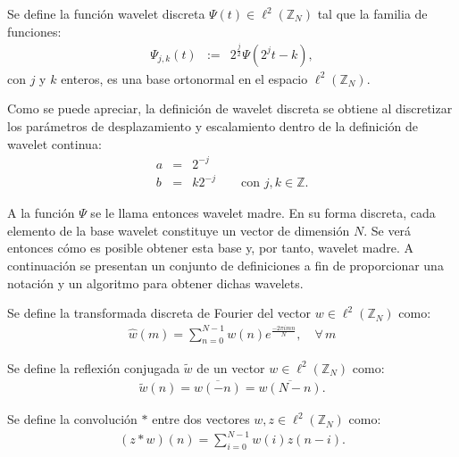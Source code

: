 \begin{definition}
Se define la funci\'on wavelet discreta $\Psi(t)\in \ell^2(\mathbb{Z}_N)$ tal que la familia de funciones:
\begin{eqnarray}
\Psi_{j,k}(t)&:=&2^{\frac{j}{2}}\Psi(2^jt-k),\nonumber
\end{eqnarray}
con $j$ y $k$ enteros, es una base ortonormal en el espacio $\ell^2(\mathbb{Z}_N)$.
\label{wav-discreta}
\end{definition}

\par Como se puede apreciar, la definici\'on de wavelet discreta se obtiene al discretizar los parámetros de desplazamiento y escalamiento dentro de la definici\'on de wavelet continua:
\begin{eqnarray}
a&=&2^{-j}\nonumber\\
b&=&k2^{-j}\qquad\mbox{con $j,k\in \mathbb{Z}$}.\nonumber
\end{eqnarray}

\par A la funci\'on $\Psi$ se le llama entonces wavelet madre. En su forma discreta, cada elemento de la base wavelet constituye un vector de dimensi\'on $N$. Se ver\'a entonces c\'omo es posible obtener esta base y, por tanto, wavelet madre. A continuaci\'on se presentan un conjunto de definiciones a fin de proporcionar una notaci\'on y un algoritmo para obtener dichas wavelets.\\

\begin{definition}
Se define la transformada discreta de Fourier del vector $w\in \ell^2\left(\mathbb{Z}_N\right)$ como:
\begin{eqnarray}
\hat{w}(m)=\sum_{n=0}^{N-1}w(n)e^{\frac{-2\pi imn}{N}},\quad\forall\,m\nonumber
\end{eqnarray}
\end{definition}

\begin{definition}
Se define la reflexi\'on conjugada $\tilde{w}$ de un vector $w\in \ell^2\left(\mathbb{Z}_N\right)$ como:
\begin{eqnarray}
\tilde{w}(n)=\overline{w(-n)}=\overline{w(N-n)}.\nonumber
\end{eqnarray}
\end{definition}

\begin{definition}
Se define la convoluci\'on $\ast$ entre dos vectores $w,z\in \ell^2(\mathbb{Z}_N)$ como:
\begin{eqnarray}
(z \ast w )(n) = \sum_{i=0}^{N-1}w(i)z(n-i).\nonumber
\end{eqnarray}
\end{definition}

